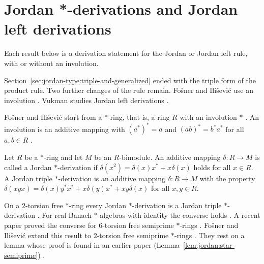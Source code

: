\section{Jordan *-derivations and Jordan left derivations}\label{sec:jordan-type:star-left}

Each result below is a derivation statement for the Jordan or Jordan left rule, with or without an involution.

Section~\ref{sec:jordan-type:triple-and-generalized} ended with the triple form of the product rule.
Two further changes of the rule remain. Fošner and Ilišević use an involution
\cite[p.~416]{FosnerIlisevic2008}. Vukman studies Jordan left derivations
\cite[p.~1]{Vukman1997}.

Fošner and Ilišević start from a $\ast$-ring, that is, a ring $R$ with an involution $\ast$
\cite[Section~1, p.~415]{FosnerIlisevic2008}. An involution is an additive mapping with
$(a^{\ast})^{\ast}=a$ and $(ab)^{\ast}=b^{\ast}a^{\ast}$ for all $a,b\in R$
\cite[p.~415]{FosnerIlisevic2008}.

\begin{definition}\label{def:jordan:star}
Let $R$ be a $\ast$-ring and let $M$ be an $R$-bimodule. An additive mapping $\delta\colon R\to M$ is
called a Jordan $\ast$-derivation if $\delta(x^{2})=\delta(x)x^{\ast}+x\delta(x)$ holds for all
$x\in R$. A Jordan triple $\ast$-derivation is an additive mapping $\delta\colon R\to M$ with the
property $\delta(xyx)=\delta(x)y^{\ast}x^{\ast}+x\delta(y)x^{\ast}+xy\delta(x)$ for all $x,y\in R$.
\end{definition}

On a $2$-torsion free $\ast$-ring every Jordan $\ast$-derivation is a Jordan triple $\ast$-derivation
\cite[p.~417]{FosnerIlisevic2008}. For real Banach $\ast$-algebras with identity the converse holds
\cite[p.~417]{FosnerIlisevic2008}. A recent paper proved the converse for $6$-torsion free semiprime
$\ast$-rings \cite[p.~417]{FosnerIlisevic2008}. Fošner and Ilišević extend this result to $2$-torsion free semiprime
$\ast$-rings \cite[p.~417]{FosnerIlisevic2008}. They rest on a lemma whose proof is found in an earlier paper (Lemma~\ref{lem:jordan:star-semiprime}) \cite[p.~425]{FosnerIlisevic2008}.

